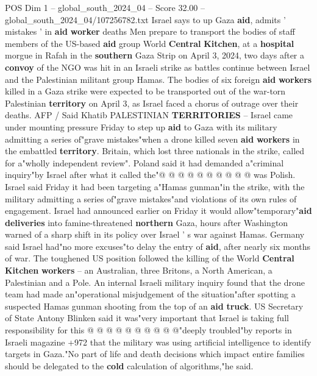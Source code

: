 \begin{textsample}{POS Dim 1 – global\_south\_2024\_04 – Score 32.00 – global\_south\_2024\_04/107256782.txt}  \label{ex:f1_pos_144}
Israel says to up Gaza \textbf{aid}, admits ' mistakes ' in \textbf{aid} \textbf{worker} deaths Men prepare to transport the bodies of staff members of the US-based \textbf{aid} group World \textbf{Central} \textbf{Kitchen}, at a \textbf{hospital} morgue in Rafah in the \textbf{southern} Gaza Strip on April 3, 2024, two days after a \textbf{convoy} of the NGO was hit in an Israeli strike as battles continue between Israel and the Palestinian militant group Hamas.
The bodies of six foreign \textbf{aid} \textbf{workers} killed in a Gaza strike were expected to be transported out of the war-torn Palestinian \textbf{territory} on April 3, as Israel faced a chorus of outrage over their deaths.
AFP / Said Khatib PALESTINIAN \textbf{TERRITORIES} -- Israel came under mounting pressure Friday to step up \textbf{aid} to Gaza with its military admitting a series of"grave mistakes"when a drone killed seven \textbf{aid} \textbf{workers} in the embattled \textbf{territory}.
Britain, which lost three nationals in the strike, called for a"wholly independent review".
Poland said it had demanded a"criminal inquiry"by Israel after what it called the"@ @ @ @ @ @ @ @ @ @ was Polish.
Israel said Friday it had been targeting a"Hamas gunman"in the strike, with the military admitting a series of"grave mistakes"and violations of its own rules of engagement.
Israel had announced earlier on Friday it would allow"temporary"\textbf{aid} \textbf{deliveries} into famine-threatened \textbf{northern} Gaza, hours after Washington warned of a sharp shift in its policy over Israel ' s war against Hamas.
Germany said Israel had"no more excuses"to delay the entry of \textbf{aid}, after nearly six months of war.
The toughened US position followed the killing of the World \textbf{Central} \textbf{Kitchen} \textbf{workers} -- an Australian, three Britons, a North American, a Palestinian and a Pole.
An internal Israeli military inquiry found that the drone team had made an"operational misjudgement of the situation"after spotting a suspected Hamas gunman shooting from the top of an \textbf{aid} \textbf{truck}.
US Secretary of State Antony Blinken said it was"very important that Israel is taking full responsibility for this @ @ @ @ @ @ @ @ @ @"deeply troubled"by reports in Israeli magazine +972 that the military was using artificial intelligence to identify targets in Gaza."No part of life and death decisions which impact entire families should be delegated to the \textbf{cold} calculation of algorithms,"he said.

\end{textsample}

